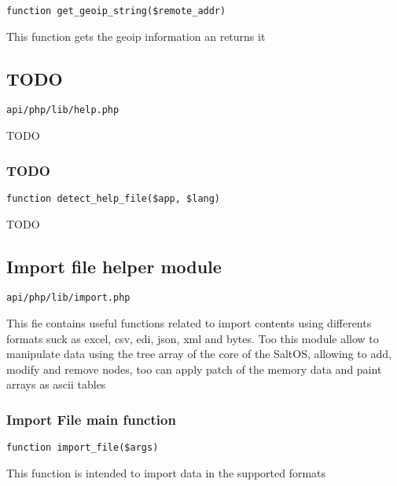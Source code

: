 \documentclass[a4paper]{article}
\begin{document}
\begin{lstlisting}
function get_geoip_string($remote_addr)
\end{lstlisting}

This function gets the geoip information an returns it

\hypertarget{toc459}{}
\subsection{TODO}

\begin{lstlisting}
api/php/lib/help.php
\end{lstlisting}

TODO

\hypertarget{toc460}{}
\subsubsection{TODO}

\begin{lstlisting}
function detect_help_file($app, $lang)
\end{lstlisting}

TODO

\hypertarget{toc461}{}
\subsection{Import file helper module}

\begin{lstlisting}
api/php/lib/import.php
\end{lstlisting}

This fie contains useful functions related to import contents using differents formats suck as
excel, csv, edi, json, xml and bytes. Too this module allow to manipulate data using the tree
array of the core of the SaltOS, allowing to add, modify and remove nodes, too can apply patch
of the memory data and paint arrays as ascii tables

\hypertarget{toc462}{}
\subsubsection{Import File main function}

\begin{lstlisting}
function import_file($args)
\end{lstlisting}

This function is intended to import data in the supported formats
\end{document}
